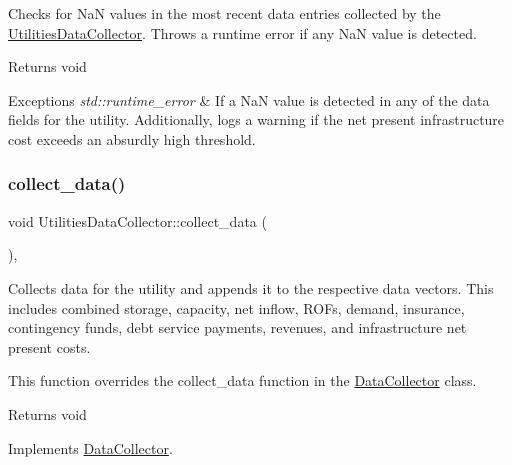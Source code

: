 Checks for {\ttfamily NaN} values in the most recent data entries collected by the {\ttfamily \mbox{\hyperlink{classUtilitiesDataCollector}{Utilities\+Data\+Collector}}}. Throws a runtime error if any {\ttfamily NaN} value is detected. 

\begin{DoxyReturn}{Returns}
void
\end{DoxyReturn}

\begin{DoxyExceptions}{Exceptions}
{\em std\+::runtime\+\_\+error} & If a {\ttfamily NaN} value is detected in any of the data fields for the utility. Additionally, logs a warning if the net present infrastructure cost exceeds an absurdly high threshold. \\
\hline
\end{DoxyExceptions}
\mbox{\label{classUtilitiesDataCollector_ab72c4432d6816beb1f4f4b354fb3023d}} 
\subsubsection{\texorpdfstring{collect\+\_\+data()}{collect\_data()}}
{\footnotesize\ttfamily void Utilities\+Data\+Collector\+::collect\+\_\+data (\begin{DoxyParamCaption}{ }\end{DoxyParamCaption})\hspace{0.3cm}{\ttfamily [override]}, {\ttfamily [virtual]}}



Collects data for the utility and appends it to the respective data vectors. This includes combined storage, capacity, net inflow, R\+O\+Fs, demand, insurance, contingency funds, debt service payments, revenues, and infrastructure net present costs. 

This function overrides the {\ttfamily collect\+\_\+data} function in the {\ttfamily \mbox{\hyperlink{classDataCollector}{Data\+Collector}}} class.

\begin{DoxyReturn}{Returns}
void 
\end{DoxyReturn}


Implements \mbox{\hyperlink{classDataCollector_a01486bf58acbe37b203f97b3b9a79c40}{Data\+Collector}}.

